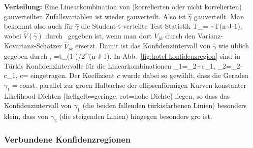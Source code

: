 \item \textbf{Verteilung:}
Eine Linearkombination von (korrelierten oder nicht korrelierten)
gau\3verteilten Zufallsvariablen ist wieder gau\3verteilt. Also ist
$\hat{\gamma}$ gau\3verteilt.
\ei
\medskip
Man bekommt also auch f\"ur $\hat{\gamma}$ die Student-t-verteilte
Test-Statistik
\be
T_\gamma= \sim T(n-J-1),
\ee
wobei $\hat{V}(\hat{\gamma})$ durch~ gegeben ist, wenn man dort
$V_{jk}$ durch den Varianz-Kovarianz-Sch\"atzer $\hat{V}_{jk}$
ersetzt.
Damit ist das Konfidenzintervall von $\hat{\gamma}$ wie \"ublich gegeben durch
\be
\label{KI-linKomb}
\gamma \in \left[
 \, \hat{\gamma}-\Delta \hat{\gamma},  
\hat{\gamma}+\Delta \hat{\gamma} \,
\right], \quad
\Delta \hat{\gamma} =t_{(1-\alpha)/2}^{(n-J-1)}.
\ee
In Abb.~\ref{fig:hotel-konfidenzregion} sind in T\"urkis Konfidenzintervalle 
f\"ur die Linearkombinationen
\bdm
\gamma_1=\beta_2+c\beta_1, \quad
\gamma_2=\beta_2-c\beta_1, \quad
c=
\edm
eingetragen. Der Koeffizient $c$ wurde dabei so gew\"ahlt, dass die
Geraden $\gamma_1=\text{const.}$ parallel zur gro\3en Halbachse der
ellipsenf\"ormigen Kurven konstanter Likelihood-Dichten
(hellgelb=geringe, rot=hohe Dichte) liegen, so dass das
Konfidenzintervall von $\gamma_1$ (die beiden fallenden t\"urkisfarbenen
Linien) besonders klein, dass von $\gamma_2$ (die steigenden Linien)
hingegen besonders gro\3 ist.

\subsubsection{\label{sec:kombi}Verbundene Konfidenzregionen}

